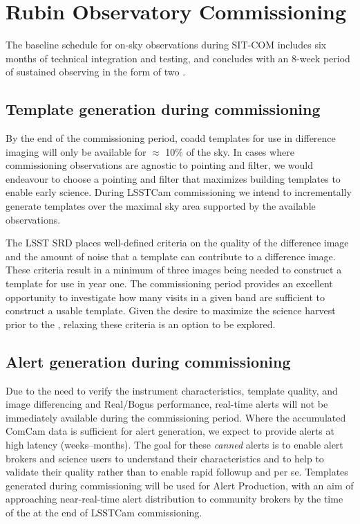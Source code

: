 \section{Rubin Observatory Commissioning} 
\label{sec:commissioning}

The baseline schedule for on-sky observations during SIT-COM includes six months of technical integration and testing, and concludes with an 8-week period of sustained observing in the form of two \svs \citep{SCTN-007}. 

\subsection{Template generation during commissioning}

By the end of the commissioning period, coadd templates for use in difference imaging will only be available for $\approx$ 10\% of the sky. 
In cases where commissioning observations are agnostic to pointing and filter, we would endeavour to choose a pointing and filter that maximizes building templates to enable early science. 
During LSSTCam commissioning we intend to incrementally generate templates over the maximal sky area supported by the available observations.

The LSST SRD places well-defined criteria on the quality of the difference image and the amount of noise that a template can contribute to a difference image.  
These criteria result in a minimum of three images being needed to construct a template for use in year one.  
The commissioning period provides an excellent opportunity to investigate how many visits in a given band are sufficient to construct a usable template. 
Given the desire to maximize the science harvest prior to the \drone,  relaxing these criteria is an option to be explored. 

\subsection{Alert generation during commissioning}

Due to the need to verify the instrument characteristics, template quality, and image differencing and Real/Bogus performance, real-time alerts will not be immediately available during the commissioning period. 
Where the accumulated ComCam data is sufficient for alert generation, we expect to provide alerts at high latency (weeks--months). 
The goal for these {\it canned} alerts is to enable alert brokers and science users to understand their characteristics and to help to validate their quality rather than to enable rapid followup and \es per se.
Templates generated during commissioning will be used for Alert Production, with an aim of approaching near-real-time alert distribution to community brokers by the time of the \svs at the end of LSSTCam commissioning. 

